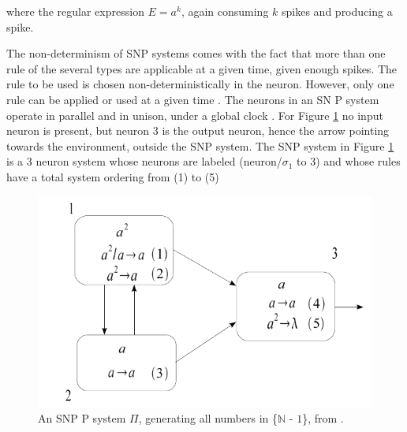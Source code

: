 \documentclass{acm_proc_article-sp}
\begin{document}
where the regular expression $E = a^k$, again consuming $k$ spikes and producing a spike.

The non-determinism of SNP systems comes with the fact
that more than one rule of the several types are applicable at
a given time, given enough spikes. The rule to be used is
chosen non-deterministically in the neuron. However, only
one rule can be applied or used at a given time \cite{snp}\cite{snpbrain}\cite{snpmat}. The
neurons in an SN P system operate in parallel and in unison,
under a global clock \cite{snp}. For Figure \ref{snp_ex} no input neuron is present,
but neuron 3 is the output neuron, hence the arrow pointing
towards the environment, outside the SNP system. The SNP system in Figure \ref{snp_ex} is a 3 neuron system whose neurons are labeled (neuron/$\sigma_1$ to 3) and whose rules have a total system ordering from (1) to (5)


	\begin{figure}
		\centering
		\includegraphics[scale=.5]{snp-img.png} 
		\caption{An SNP P system $\Pi$, generating all numbers in \{$\mathbb N$ - $1$\}, from \cite{snpmat}.}
		\label{snp_ex}
	\end{figure}



\end{document}
